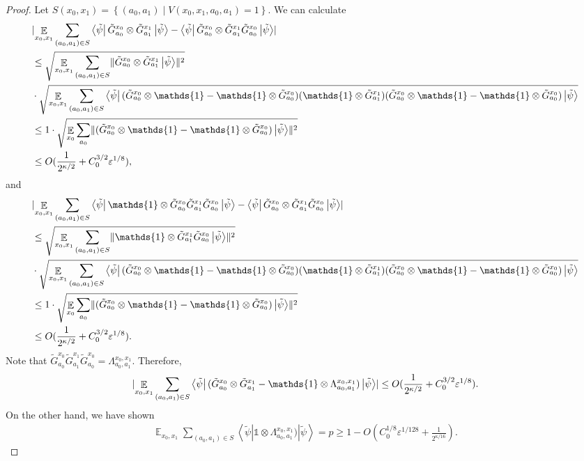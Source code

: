 \documentclass[10pt,a4paper]{article}
\theoremstyle{plain}
\theoremstyle{definition}
\newcommand {\set} [1] {\ensuremath{ \left\lbrace #1 \right\rbrace }}
\DeclarePairedDelimiter{\norm}{\lVert}{\rVert}
\DeclarePairedDelimiter{\abs}{\lvert}{\rvert}
\newcommand {\bra} [1] {\ensuremath{ \left\langle #1 \right| }}
\newcommand {\ket} [1] {\ensuremath{ \left| #1 \right\rangle }}
\DeclareMathOperator*{\bigE}{\mathbb{E}}
\newcommand {\id} {\ensuremath{\mathds{1}}}
\newcommand{\ep} {\ensuremath{\varepsilon}}
\newcommand{\x}{\otimes}
\newcommand{\1}{\mathbb{1}} %
\newcommand{\tG}{\tilde{G}}
\newcommand{\tpsi}{\tilde{\psi}}
\begin{document}
\begin{proof}
Let $S(x_0,x_1) = \set{(a_0, a_1) \mid V(x_0, x_1,a_0,a_1) =1}$.
We can calculate
\begin{align*}
	&\abs{\bigE_{x_0,x_1} \sum_{(a_0, a_1) \in S} \bra{\tpsi} \tG^{x_0}_{a_0} \x \tG^{x_1}_{a_1} \ket{\tpsi}
	- \bra{\tpsi} \tG^{x_0}_{a_0}  \x \tG^{x_1}_{a_1}\tG^{x_0}_{a_0} \ket{\tpsi}} \\
	&\leq \sqrt{ \bigE_{x_0,x_1} \sum_{(a_0, a_1) \in S} \norm{ \tG^{x_0}_{a_0} \x \tG^{x_1}_{a_1} \ket{\tpsi} }^2} \\
	&\cdot \sqrt{  \bigE_{x_0,x_1} \sum_{(a_0, a_1) \in S} \bra{\tpsi} (\tG^{x_0}_{a_0} \x \id - \id \x \tG^{x_0}_{a_0}) 
	(\id \x \tG^{x_1}_{a_1} )  (\tG^{x_0}_{a_0} \x \id - \id \x \tG^{x_0}_{a_0}) \ket{\tpsi}} \\
	&\leq 1 \cdot \sqrt{  \bigE_{x_0} \sum_{a_0} \norm{  (\tG^{x_0}_{a_0} \x \id - \id \x \tG^{x_0}_{a_0}) \ket{\tpsi}}^2} \\
	&\leq O(\frac{1}{2^{\kappa/2}} + C_0^{3/2}\ep^{1/8}),
\end{align*}
and
\begin{align*}
	&\abs{\bigE_{x_0,x_1} \sum_{(a_0, a_1) \in S} \bra{\tpsi} \id \x \tG^{x_0}_{a_0} \tG^{x_1}_{a_1}\tG^{x_0}_{a_0}  \ket{\tpsi}
	- \bra{\tpsi} \tG^{x_0}_{a_0}  \x \tG^{x_1}_{a_1}\tG^{x_0}_{a_0} \ket{\tpsi}} \\
	&\leq \sqrt{ \bigE_{x_0,x_1} \sum_{(a_0, a_1) \in S} \norm{ \id \x \tG^{x_1}_{a_1}\tG^{x_0}_{a_0}  \ket{\tpsi} }^2} \\
	&\cdot \sqrt{  \bigE_{x_0,x_1} \sum_{(a_0, a_1) \in S} \bra{\tpsi} (\tG^{x_0}_{a_0} \x \id - \id \x \tG^{x_0}_{a_0}) 
	(\id \x \tG^{x_1}_{a_1} )  (\tG^{x_0}_{a_0} \x \id - \id \x \tG^{x_0}_{a_0}) \ket{\tpsi}} \\
	&\leq 1 \cdot \sqrt{  \bigE_{x_0} \sum_{a_0} \norm{  (\tG^{x_0}_{a_0} \x \id - \id \x \tG^{x_0}_{a_0}) \ket{\tpsi}}^2} \\
	&\leq O(\frac{1}{2^{\kappa/2}} + C_0^{3/2}\ep^{1/8}).
\end{align*}
Note that $\tG^{x_0}_{a_0} \tG^{x_1}_{a_1}\tG^{x_0}_{a_0} = \Lambda^{x_0,x_1}_{a_0,a_1}$.
Therefore, 
\begin{align*}
	\abs{\bigE_{x_0,x_1} \sum_{(a_0, a_1) \in S} \bra{\tpsi} (\tG^{x_0}_{a_0} \x \tG^{x_1}_{a_1} - \id \x \Lambda^{x_0,x_1}_{a_0,a_1}) \ket{\tpsi}}
	\leq O(\frac{1}{2^{\kappa/2}} + C_0^{3/2}\ep^{1/8}).
\end{align*}
On the other hand, we have shown
\begin{align*}
	\bigE_{x_0,x_1} \sum_{(a_0, a_1) \in S} \bra{\tpsi} \id \x \Lambda^{x_0,x_1}_{a_0,a_1}) \ket{\tpsi} = p \geq 1- O(C_0^{1/8}\ep^{1/128} + \frac{1}{2^{\kappa/16}}).

\end{align*}
\end{proof}
\end{document}
